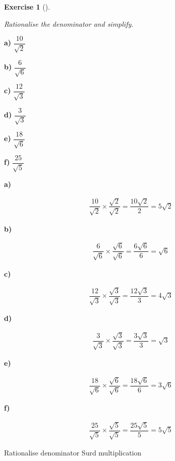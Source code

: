 \documentclass[
  letterpaper,
  DIV=11,
  numbers=noendperiod]{scrreprt}
\theoremstyle{definition}
\newtheorem{exercise}{Exercise}[chapter]
\theoremstyle{remark}
\begin{document}
\begin{exercise}[]\protect\hypertarget{exr-u2-42}{}\label{exr-u2-42}

\emph{Rationalise the denominator and simplify.}

\textbf{a)} \(\displaystyle \dfrac{10}{\sqrt{2}}\)

\textbf{b)} \(\displaystyle \dfrac{6}{\sqrt{6}}\)

\textbf{c)} \(\displaystyle \dfrac{12}{\sqrt{3}}\)

\textbf{d)} \(\displaystyle \dfrac{3}{\sqrt{3}}\)

\textbf{e)} \(\displaystyle \dfrac{18}{\sqrt{6}}\)

\textbf{f)} \(\displaystyle \dfrac{25}{\sqrt{5}}\)

\begin{tcolorbox}[enhanced jigsaw, opacitybacktitle=0.6, coltitle=black, arc=.35mm, colframe=quarto-callout-tip-color-frame, colback=white, bottomrule=.15mm, left=2mm, colbacktitle=quarto-callout-tip-color!10!white, titlerule=0mm, opacityback=0, title=\textcolor{quarto-callout-tip-color}{\faLightbulb}\hspace{0.5em}{🔍 View Solutions}, leftrule=.75mm, breakable, rightrule=.15mm, bottomtitle=1mm, toptitle=1mm, toprule=.15mm]

\textbf{a)}

\[
\begin{aligned}
\dfrac{10}{\sqrt{2}}\times\dfrac{\sqrt{2}}{\sqrt{2}}=\dfrac{10\sqrt{2}}{2}=5\sqrt{2}
\end{aligned}
\]

\textbf{b)}

\[
\begin{aligned}
\dfrac{6}{\sqrt{6}}\times\dfrac{\sqrt{6}}{\sqrt{6}}=\dfrac{6\sqrt{6}}{6}=\sqrt{6}
\end{aligned}
\]

\textbf{c)}

\[
\begin{aligned}
\dfrac{12}{\sqrt{3}}\times\dfrac{\sqrt{3}}{\sqrt{3}}=\dfrac{12\sqrt{3}}{3}=4\sqrt{3}
\end{aligned}
\]

\textbf{d)}

\[
\begin{aligned}
\dfrac{3}{\sqrt{3}}\times\dfrac{\sqrt{3}}{\sqrt{3}}=\dfrac{3\sqrt{3}}{3}=\sqrt{3}
\end{aligned}
\]

\textbf{e)}

\[
\begin{aligned}
\dfrac{18}{\sqrt{6}}\times\dfrac{\sqrt{6}}{\sqrt{6}}=\dfrac{18\sqrt{6}}{6}=3\sqrt{6}
\end{aligned}
\]

\textbf{f)}

\[
\begin{aligned}
\dfrac{25}{\sqrt{5}}\times\dfrac{\sqrt{5}}{\sqrt{5}}=\dfrac{25\sqrt{5}}{5}=5\sqrt{5}
\end{aligned}
\]

\end{tcolorbox}

{Rationalise denominator} {Surd multiplication}

\end{exercise}
\end{document}
